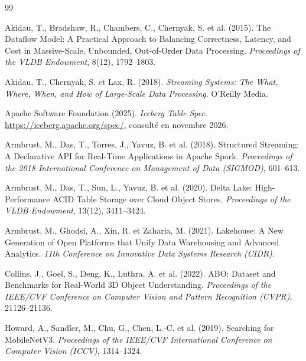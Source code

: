 \cleardoublepage
{}
{}
\begin{thebibliography}{99}
\small

Akidau, T., Bradshaw, R., Chambers, C., Chernyak, S. et al. (2015).
The Dataflow Model: A Practical Approach to Balancing Correctness, Latency, and Cost in
Massive-Scale, Unbounded, Out-of-Order Data Processing.
\emph{Proceedings of the VLDB Endowment}, 8(12), 1792--1803.

Akidau, T., Chernyak, S. et Lax, R. (2018).
\emph{Streaming Systems: The What, Where, When, and How of Large-Scale Data Processing}.
O'Reilly Media.

Apache Software Foundation (2025).
\emph{Iceberg Table Spec}.
\url{https://iceberg.apache.org/spec/}, consulté en novembre 2026.

Armbrust, M., Das, T., Torres, J., Yavuz, B. et al. (2018).
Structured Streaming: A Declarative API for Real-Time Applications in Apache Spark.
\emph{Proceedings of the 2018 International Conference on Management of Data (SIGMOD)},
601--613.

Armbrust, M., Das, T., Sun, L., Yavuz, B. et al. (2020).
Delta Lake: High-Performance ACID Table Storage over Cloud Object Stores.
\emph{Proceedings of the VLDB Endowment}, 13(12), 3411--3424.

Armbrust, M., Ghodsi, A., Xin, R. et Zaharia, M. (2021).
Lakehouse: A New Generation of Open Platforms that Unify Data Warehousing and Advanced
Analytics.
\emph{11th Conference on Innovative Data Systems Research (CIDR)}.

Collins, J., Goel, S., Deng, K., Luthra, A. et al. (2022).
ABO: Dataset and Benchmarks for Real-World 3D Object Understanding.
\emph{Proceedings of the IEEE/CVF Conference on Computer Vision and Pattern Recognition (CVPR)},
21126--21136.

Howard, A., Sandler, M., Chu, G., Chen, L.-C. et al. (2019).
Searching for MobileNetV3.
\emph{Proceedings of the IEEE/CVF International Conference on Computer Vision (ICCV)},
1314--1324.


\end{thebibliography}
